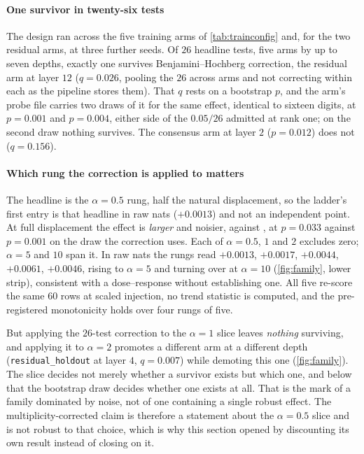\paragraph{One survivor in twenty-six tests} The design ran across the five
training arms of \cref{tab:trainconfig} and, for the two residual arms, at three
further seeds. Of $26$ headline tests, five arms by up to seven depths, exactly
one survives Benjamini--Hochberg correction, the residual arm at layer $12$
($q = 0.026$, pooling the $26$ across arms and not correcting within each as the
pipeline stores them). That $q$ rests on a bootstrap $p$, and the arm's probe
file carries two draws of it for the same effect, identical to sixteen digits, at
$p = 0.001$ and $p = 0.004$, either side of the $0.05/26$ admitted at rank one;
on the second draw nothing survives. The consensus arm at layer $2$ ($p = 0.012$)
does not ($q = 0.156$).

\paragraph{Which rung the correction is applied to matters} The headline is the
$\alpha = 0.5$ rung, half the natural displacement, so the ladder's first entry
is that headline in raw nats ($+0.0013$) and not an independent point. At full
displacement the effect is \emph{larger} and noisier,
 against , at
$p = 0.033$ against $p = 0.001$ on the draw the correction uses. Each of
$\alpha = 0.5$, $1$ and $2$ excludes zero; $\alpha = 5$ and $10$ span it. In raw
nats the rungs read $+0.0013$, $+0.0017$, $+0.0044$, $+0.0061$, $+0.0046$, rising
to $\alpha = 5$ and turning over at $\alpha = 10$ (\cref{fig:family}, lower
strip), consistent with a dose--response without establishing one. All five
re-score the same $60$ rows at scaled injection, no trend statistic is computed,
and the pre-registered monotonicity holds over four rungs of five.

But applying the $26$-test correction to the $\alpha = 1$ slice leaves
\emph{nothing} surviving, and applying it to $\alpha = 2$ promotes a different
arm at a different depth (\texttt{residual\_holdout} at layer $4$, $q = 0.007$)
while demoting this one (\cref{fig:family}). The slice decides not merely
whether a survivor exists but which one, and below that the bootstrap draw
decides whether one exists at all. That is the mark of a family dominated by
noise, not of one containing a single robust effect. The multiplicity-corrected
claim is therefore a statement about the $\alpha = 0.5$ slice and is not robust
to that choice, which is why this section opened by discounting its own result
instead of closing on it.

